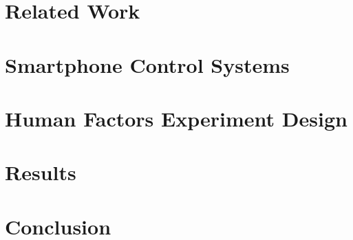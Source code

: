 \documentclass[12pt,a4paper]{report}
\begin{document}

\chapter{Related Work}

\chapter{Smartphone Control Systems}


\chapter{Human Factors Experiment Design}

\chapter{Results}

\chapter{Conclusion}



\end{document}
